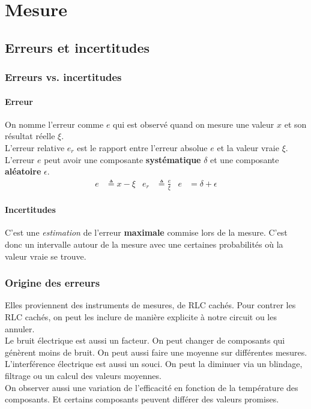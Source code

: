 \documentclass{report}
\begin{document}
\chapter{Mesure}
\section{Erreurs et incertitudes}
\subsection{Erreurs vs. incertitudes}
\subsubsection{Erreur}
On nomme l'erreur comme $e$ qui est observé quand on mesure une valeur $x$ et son résultat réelle $\xi$.\\
L'erreur relative $e_r$ est le rapport entre l'erreur absolue $e$ et la valeur vraie $\xi$.\\ 
L'erreur $e$ peut avoir une composante \textbf{systématique} $\delta$ et une composante \textbf{aléatoire} $\epsilon$.
\begin{align*}
e &\triangleq  x - \xi & e_r &\triangleq \frac{e}{\xi} & e &= \delta + \epsilon 
\end{align*}

\subsubsection{Incertitudes}
C'est une \textit{estimation} de l'erreur \textbf{maximale} commise lors de la mesure. C'est donc un intervalle autour de la mesure avec une certaines probabilités où la valeur vraie se trouve. 


\subsection{Origine des erreurs}
Elles proviennent des instruments de mesures, de RLC cachés. Pour contrer les RLC cachés, on peut les inclure de manière explicite à notre circuit ou les annuler.\\
Le bruit électrique est aussi un facteur. On peut changer de composants qui génèrent moins de bruit. On peut aussi faire une moyenne sur différentes mesures.\\
L'interférence électrique est aussi un souci. On peut la diminuer via un blindage, filtrage ou un calcul des valeurs moyennes.\\
On observer aussi une variation de l'efficacité en fonction de la température des composants. Et certains composants peuvent différer des valeurs promises.
\end{document}
